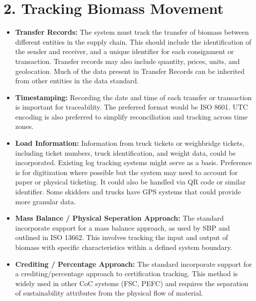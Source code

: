 \documentclass{article}
\begin{document}
\section*{2. Tracking Biomass Movement}
\begin{itemize}
    \item \textbf{Transfer Records:} The system must track the transfer of biomass between different entities in the supply chain. This should include the identification of the sender and receiver, and a unique identifier for each consignment or transaction. Transfer records may also include quantity, prices, units, and geolocation. Much of the data present in Transfer Records can be inherited from other entities in the data standard. 
    \item \textbf{Timestamping:} Recording the date and time of each transfer or transaction is important for traceability. The preferred format would be ISO 8601. UTC encoding is also preferred to simplify reconciliation and tracking across time zones. 
    \item \textbf{Load Information:} Information from truck tickets or weighbridge tickets, including ticket numbers, truck identification, and weight data, could be incorporated. Existing log tracking systems might serve as a basis. Preference is for digitization where possible but the system may need to account for paper or physical ticketing. It could also be handled via QR code or similar identifier. Some skidders and trucks have GPS systems that could provide more granular data. 
    \item \textbf{Mass Balance / Physical Seperation Approach:} The standard incorporate support for a mass balance approach, as used by SBP and outlined in ISO 13662. This involves tracking the input and output of biomass with specific characteristics within a defined system boundary.
    \item \textbf{Crediting / Percentage Approach:} The standard incorporate support for a crediting/percentage approach to certification tracking. This method is widely used in other CoC systems (FSC, PEFC) and requires the separation of sustainability attributes from the physical flow of material.
\end{itemize}
\end{document}
